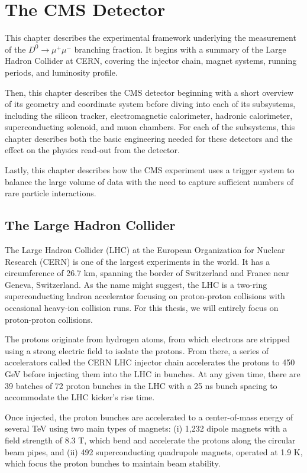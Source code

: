 \chapter{The CMS Detector}
\label{ch:3}

This chapter describes the experimental framework underlying the measurement of the $D^0 \to \mu^+ \mu^-$ branching fraction. It begins with a summary of the Large Hadron Collider at CERN, covering the injector chain, magnet systems, running periods, and luminosity profile. 

Then, this chapter describes the CMS detector beginning with a short overview of its geometry and coordinate system before diving into each of its subsystems, including the silicon tracker, electromagnetic calorimeter, hadronic calorimeter, superconducting solenoid, and muon chambers. For each of the subsystems, this chapter describes both the basic engineering needed for these detectors and the effect on the physics read-out from the detector. 

Lastly, this chapter describes how the CMS experiment uses a trigger system to balance the large volume of data with the need to capture sufficient numbers of rare particle interactions. 

\section{The Large Hadron Collider}

The Large Hadron Collider (LHC) at the European Organization for Nuclear Research (CERN) is one of the largest experiments in the world. It has a circumference of 26.7 km, spanning the border of Switzerland and France near Geneva, Switzerland. As the name might suggest, the LHC is a two-ring superconducting hadron accelerator focusing on proton-proton collisions with occasional heavy-ion collision runs. For this thesis, we will entirely focus on proton-proton collisions.

The protons originate from hydrogen atoms, from which electrons are stripped using a strong electric field to isolate the protons. From there, a series of accelerators called the CERN LHC injector chain accelerates the protons to 450 GeV before injecting them into the LHC in bunches. At any given time, there are 39 batches of 72 proton bunches in the LHC with a 25 ns bunch spacing to accommodate the LHC kicker's rise time.

Once injected, the proton bunches are accelerated to a center-of-mass energy of several TeV using two main types of magnets: (i) 1,232 dipole magnets with a field strength of 8.3 T, which bend and accelerate the protons along the circular beam pipes, and (ii) 492 superconducting quadrupole magnets, operated at 1.9 K, which focus the proton bunches to maintain beam stability.

